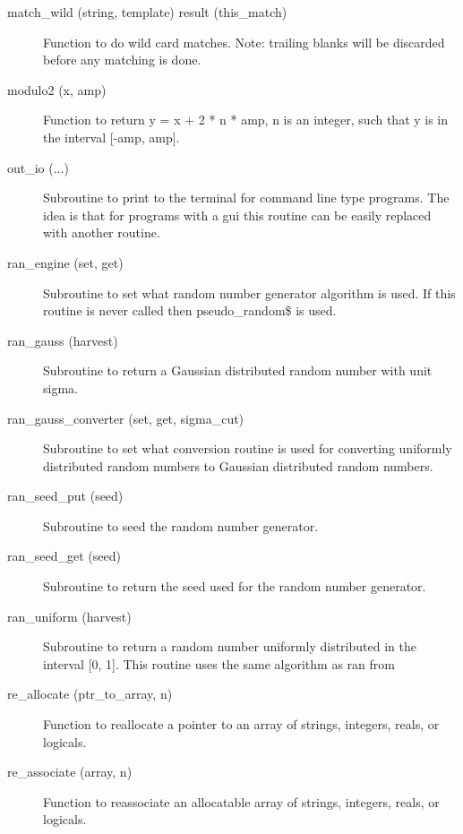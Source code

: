 \begin{description}
\item[match_wild (string, template) result (this_match)] \Newline 
Function to do wild card matches. Note: trailing blanks will be discarded
before any matching is done.

\item[modulo2 (x, amp)] \Newline 
Function to return y = x + 2 * n * amp, n is an integer, such that y is 
in the interval [-amp, amp].

\item[out_io (...)] \Newline 
Subroutine to print to the terminal for command line type programs.
The idea is that for programs with a gui this routine can be easily
replaced with another routine.

\item[ran_engine (set, get)] \Newline 
Subroutine to set what random number generator algorithm is used.
If this routine is never called then pseudo_random\$ is used.

\item[ran_gauss (harvest)] \Newline 
Subroutine to return a Gaussian distributed random number with unit sigma.

\item[ran_gauss_converter (set, get, sigma_cut)] \Newline 
Subroutine to set what conversion routine is used for converting
uniformly distributed random numbers to Gaussian distributed random numbers.

\item[ran_seed_put (seed)] \Newline 
Subroutine to seed the random number generator. 

\item[ran_seed_get (seed)] \Newline 
Subroutine to return the seed used for the random number generator.

\item[ran_uniform (harvest)] \Newline 
Subroutine to return a random number uniformly distributed in the 
interval [0, 1]. This routine uses the same algorithm as ran from

\item[re_allocate (ptr_to_array, n)] \Newline 
Function to reallocate a pointer to an array of strings, integers, reals, or logicals.

\item[re_associate (array, n)] \Newline 
Function to reassociate an allocatable array of strings, integers, reals, or logicals.


\end{description}
